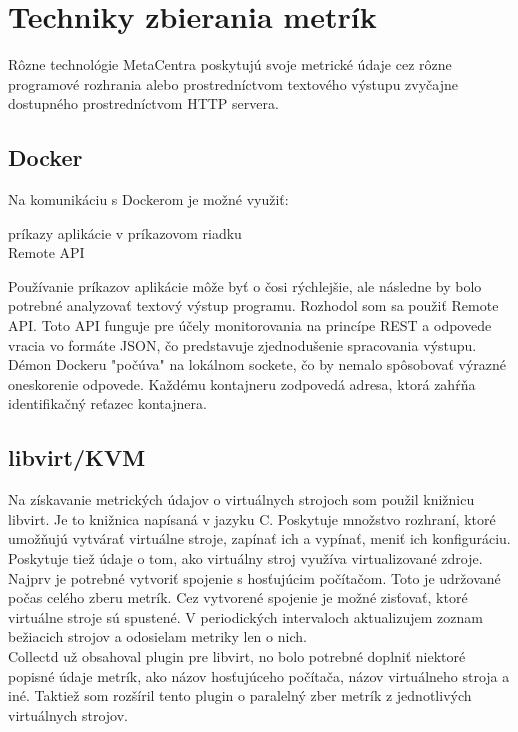 \documentclass[11pt,final,oneside]{fithesis}
\begin{document}
\section{Techniky zbierania metrík}
Rôzne technológie MetaCentra poskytujú svoje metrické údaje cez rôzne programové rozhrania alebo prostredníctvom textového výstupu zvyčajne
dostupného prostredníctvom HTTP servera.

\subsection{Docker}
Na komunikáciu s Dockerom je možné využiť:
\begin{description}
\item[príkazy aplikácie v príkazovom riadku]
\item[Remote API]
\end{description}

Používanie príkazov aplikácie môže byť o čosi rýchlejšie, ale následne by bolo potrebné analyzovať textový výstup programu.
Rozhodol som sa použiť Remote API. Toto API funguje pre účely monitorovania na princípe REST a odpovede vracia vo formáte JSON, čo predstavuje zjednodušenie spracovania výstupu. Démon Dockeru "počúva" na 
lokálnom sockete, čo by nemalo spôsobovať výrazné oneskorenie odpovede. Každému kontajneru zodpovedá adresa, ktorá zahŕňa identifikačný reťazec kontajnera.

\subsection{libvirt/KVM}
Na získavanie metrických údajov o virtuálnych strojoch som použil knižnicu libvirt. Je to knižnica napísaná v jazyku C. Poskytuje množstvo
rozhraní, ktoré umožňujú vytvárať virtuálne stroje, zapínať ich a vypínať, meniť ich konfiguráciu. Poskytuje tiež údaje o tom, ako virtuálny
stroj využíva virtualizované zdroje. 
\\Najprv je potrebné vytvoriť spojenie s hosťujúcim počítačom. Toto je udržované počas celého zberu metrík. Cez vytvorené spojenie
je možné zisťovať, ktoré virtuálne stroje sú spustené. V periodických intervaloch aktualizujem zoznam bežiacich strojov a odosielam
metriky len o nich.
\\Collectd už obsahoval plugin pre libvirt, no bolo potrebné doplniť niektoré popisné údaje metrík, ako názov hosťujúceho počítača,
názov virtuálneho stroja a iné. Taktiež som rozšíril tento plugin o paralelný zber metrík z jednotlivých virtuálnych strojov.
\end{document}
